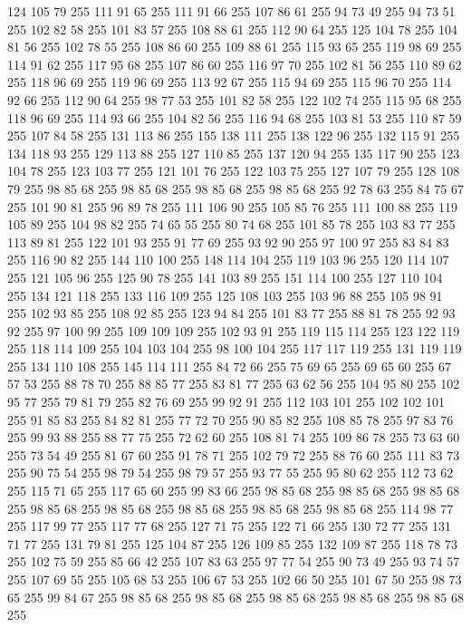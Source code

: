 124 105 79 255 111 91 65 255 111 91 66 255 107 86 61 255 94 73 49 255 94 73 51 255 102 82 58 255 101 83 57 255 108 88 61 255 112 90 64 255 125 104 78 255 104 81 56 255 102 78 55 255 108 86 60 255 109 88 61 255 115 93 65 255 119 98 69 255 114 91 62 255 117 95 68 255 107 86 60 255 116 97 70 255 102 81 56 255 110 89 62 255 118 96 69 255 119 96 69 255 113 92 67 255 115 94 69 255 115 96 70 255 114 92 66 255 112 90 64 255 98 77 53 255 101 82 58 255 122 102 74 255 115 95 68 255 118 96 69 255 114 93 66 255 104 82 56 255 116 94 68 255 103 81 53 255 110 87 59 255 107 84 58 255 131 113 86 255 155 138 111 255 138 122 96 255 132 115 91 255 134 118 93 255 129 113 88 255 127 110 85 255 137 120 94 255 135 117 90 255 123 104 78 255 123 103 77 255 121 101 76 255 122 103 75 255 127 107 79 255 128 108 79 255 98 85 68 255 98 85 68 255 98 85 68 255 98 85 68 255 92 78 63 255 84 75 67 255 101 90 81 255 96 89 78 255
111 106 90 255 105 85 76 255 111 100 88 255 119 105 89 255 104 98 82 255 74 65 55 255 80 74 68 255 101 85 78 255 103 83 77 255 113 89 81 255 122 101 93 255 91 77 69 255 93 92 90 255 97 100 97 255 83 84 83 255 116 90 82 255 144 110 100 255 148 114 104 255 119 103 96 255 120 114 107 255 121 105 96 255 125 90 78 255 141 103 89 255 151 114 100 255 127 110 104 255 134 121 118 255 133 116 109 255 125 108 103 255 103 96 88 255 105 98 91 255 102 93 85 255 108 92 85 255 123 94 84 255 101 83 77 255 88 81 78 255 92 93 92 255 97 100 99 255 109 109 109 255 102 93 91 255 119 115 114 255 123 122 119 255 118 114 109 255 104 103 104 255 98 100 104 255 117 117 119 255 131 119 119 255 134 110 108 255 145 114 111 255 84 72 66 255 75 69 65 255 69 65 60 255 67 57 53 255 88 78 70 255 88 85 77 255 83 81 77 255 63 62 56 255 104 95 80 255 102 95 77 255 79 81 79 255 82 76 69 255 99 92 91 255 112 103 101 255 102 102 101 255 91 85 83 255
84 82 81 255 77 72 70 255 90 85 82 255 108 85 78 255 97 83 76 255 99 93 88 255 88 77 75 255 72 62 60 255 108 81 74 255 109 86 78 255 73 63 60 255 73 54 49 255 81 67 60 255 91 78 71 255 102 79 72 255 88 76 60 255 111 83 73 255 90 75 54 255 98 79 54 255 98 79 57 255 93 77 55 255 95 80 62 255 112 73 62 255 115 71 65 255 117 65 60 255 99 83 66 255 98 85 68 255 98 85 68 255 98 85 68 255 98 85 68 255 98 85 68 255 98 85 68 255 98 85 68 255 98 85 68 255 114 98 77 255 117 99 77 255 117 77 68 255 127 71 75 255 122 71 66 255 130 72 77 255 131 71 77 255 131 79 81 255 125 104 87 255 126 109 85 255 132 109 87 255 118 78 73 255 102 75 59 255 85 66 42 255 107 83 63 255 97 77 54 255 90 73 49 255 93 74 57 255 107 69 55 255 105 68 53 255 106 67 53 255 102 66 50 255 101 67 50 255 98 73 65 255 99 84 67 255 98 85 68 255 98 85 68 255 98 85 68 255 98 85 68 255 98 85 68 255
